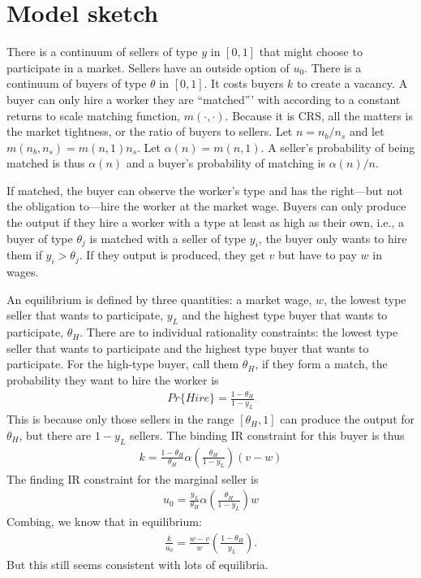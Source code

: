 \section{Model sketch}

There is a continuum of sellers of type $y$ in $[0,1]$ that might choose to participate in a market.
Sellers have an outside option of $u_0$. 
There is a continuum of buyers of type $\theta$ in $[0,1]$.
It costs buyers $k$ to create a vacancy.
A buyer can only hire a worker they are ``matched''' with according to a constant returns to scale matching function, $m(\cdot,\cdot)$.
Because it is CRS, all the matters is the market tightness, or the ratio of buyers to sellers. 
Let $n = n_b / n_s$ and let $m(n_b, n_s) = m(n, 1) n_s$.
Let $\alpha(n) = m(n,1)$.
A seller's probability of being matched is thus $\alpha(n)$ and a buyer's probability of matching is $\alpha(n)/n$. 

If matched, the buyer can observe the worker's type and has the right---but not the obligation to---hire the worker at the market wage.
Buyers can only produce the output if they hire a worker with a type at least as high as their own, i.e., a buyer of type $\theta_j$ is matched with a seller of type $y_i$, the buyer only wants to hire them if $y_i > \theta_j$.
If they output is produced, they get $v$ but have to pay $w$ in wages. 

An equilibrium is defined by three quantities: a market wage, $w$, the lowest type seller that wants to participate, $y_L$ and the highest type buyer that wants to participate, $\theta_H$.
There are to individual rationality constraints: the lowest type seller that wants to participate and the highest type buyer that wants to participate.
For the high-type buyer, call them $\theta_H$, if they form a match, the probability they want to hire the worker is
\begin{align}
  Pr\{Hire\} = \frac{1 - \theta_H}{1 - y_L}
\end{align}
This is because only those sellers in the range $[\theta_H,1]$ can produce the output for $\theta_H$, but there are $1 - y_L$ sellers. 
The binding IR constraint for this buyer is thus
\begin{align}
  k = \frac{1 - \theta_H}{\theta_H}
  \alpha\left(\frac{\theta_H}{1-y_L}\right) \left(v - w\right)
\end{align}
The finding IR constraint for the marginal seller is
\begin{align}
  u_0 = \frac{y_L}{\theta_H} \alpha\left(\frac{\theta_H}{1-y_L}\right) w
\end{align}
Combing, we know that in equilibrium: 
\begin{align}
  \frac{k}{u_0} = \frac{w-v}{w} \left(\frac{1 - \theta_H}{y_L} \right).
\end{align}
But this still seems consistent with lots of equilibria.
